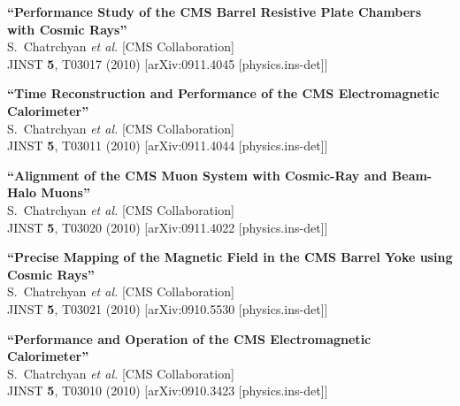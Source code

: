 \documentclass[10pt, a4paper]{article}
\begin{document}
\begin{thebibliography}{599}
{\bf ``Performance Study of the CMS Barrel Resistive Plate Chambers with Cosmic Rays''}
  \\{}S.~Chatrchyan {\it et al.}  [CMS Collaboration]
  \\{}JINST {\bf 5}, T03017 (2010)
  [arXiv:0911.4045 [physics.ins-det]]

{\bf ``Time Reconstruction and Performance of the CMS Electromagnetic Calorimeter''}
  \\{}S.~Chatrchyan {\it et al.}  [CMS Collaboration]
  \\{}JINST {\bf 5}, T03011 (2010)
  [arXiv:0911.4044 [physics.ins-det]]

{\bf ``Alignment of the CMS Muon System with Cosmic-Ray and Beam-Halo Muons''}
  \\{}S.~Chatrchyan {\it et al.}  [CMS Collaboration]
  \\{}JINST {\bf 5}, T03020 (2010)
  [arXiv:0911.4022 [physics.ins-det]]

{\bf ``Precise Mapping of the Magnetic Field in the CMS Barrel Yoke using Cosmic Rays''}
  \\{}S.~Chatrchyan {\it et al.}  [CMS Collaboration]
  \\{}JINST {\bf 5}, T03021 (2010)
  [arXiv:0910.5530 [physics.ins-det]]

{\bf ``Performance and Operation of the CMS Electromagnetic Calorimeter''}
  \\{}S.~Chatrchyan {\it et al.}  [CMS Collaboration]
  \\{}JINST {\bf 5}, T03010 (2010)
  [arXiv:0910.3423 [physics.ins-det]]


\end{thebibliography}
\end{document}
